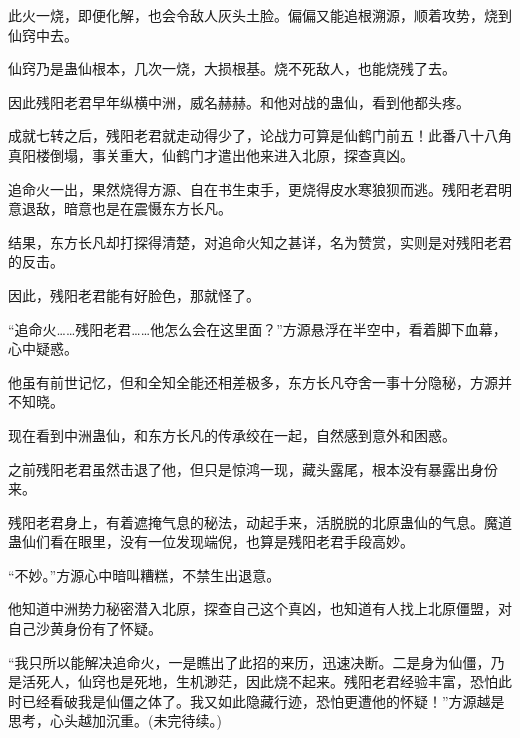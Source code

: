 \begin{this_body}
此火一烧，即便化解，也会令敌人灰头土脸。偏偏又能追根溯源，顺着攻势，烧到仙窍中去。

仙窍乃是蛊仙根本，几次一烧，大损根基。烧不死敌人，也能烧残了去。

因此残阳老君早年纵横中洲，威名赫赫。和他对战的蛊仙，看到他都头疼。

成就七转之后，残阳老君就走动得少了，论战力可算是仙鹤门前五！此番八十八角真阳楼倒塌，事关重大，仙鹤门才遣出他来进入北原，探查真凶。

追命火一出，果然烧得方源、自在书生束手，更烧得皮水寒狼狈而逃。残阳老君明意退敌，暗意也是在震慑东方长凡。

结果，东方长凡却打探得清楚，对追命火知之甚详，名为赞赏，实则是对残阳老君的反击。

因此，残阳老君能有好脸色，那就怪了。

“追命火……残阳老君……他怎么会在这里面？”方源悬浮在半空中，看着脚下血幕，心中疑惑。

他虽有前世记忆，但和全知全能还相差极多，东方长凡夺舍一事十分隐秘，方源并不知晓。

现在看到中洲蛊仙，和东方长凡的传承绞在一起，自然感到意外和困惑。

之前残阳老君虽然击退了他，但只是惊鸿一现，藏头露尾，根本没有暴露出身份来。

残阳老君身上，有着遮掩气息的秘法，动起手来，活脱脱的北原蛊仙的气息。魔道蛊仙们看在眼里，没有一位发现端倪，也算是残阳老君手段高妙。

“不妙。”方源心中暗叫糟糕，不禁生出退意。

他知道中洲势力秘密潜入北原，探查自己这个真凶，也知道有人找上北原僵盟，对自己沙黄身份有了怀疑。

“我只所以能解决追命火，一是瞧出了此招的来历，迅速决断。二是身为仙僵，乃是活死人，仙窍也是死地，生机渺茫，因此烧不起来。残阳老君经验丰富，恐怕此时已经看破我是仙僵之体了。我又如此隐藏行迹，恐怕更遭他的怀疑！”方源越是思考，心头越加沉重。(未完待续。)

\end{this_body}

